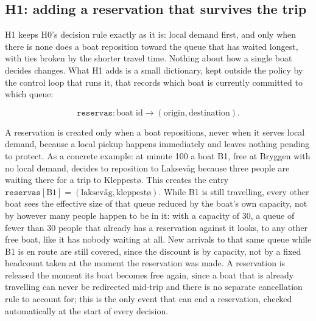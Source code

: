 \documentclass[11pt,a4paper]{article}
\begin{document}
\subsection{H1: adding a reservation that survives the trip}
\label{sec:h1}

H1 keeps H0's decision rule exactly as it is: local demand first, and only when there is none does a boat reposition toward the queue that has waited longest, with ties broken by the shorter travel time. Nothing about how a single boat decides changes. What H1 adds is a small dictionary, kept outside the policy by the control loop that runs it, that records which boat is currently committed to which queue:

\begin{equation}
\texttt{reservas}: \text{boat id} \rightarrow (\text{origin}, \text{destination}).
\end{equation}

A reservation is created only when a boat repositions, never when it serves local demand, because a local pickup happens immediately and leaves nothing pending to protect. As a concrete example: at minute 100 a boat B1, free at Bryggen with no local demand, decides to reposition to Laksevåg because three people are waiting there for a trip to Kleppestø. This creates the entry $\texttt{reservas}[\text{B1}] = (\text{laksevåg}, \text{kleppestø})$. While B1 is still travelling, every other boat sees the effective size of that queue reduced by the boat's own capacity, not by however many people happen to be in it: with a capacity of 30, a queue of fewer than 30 people that already has a reservation against it looks, to any other free boat, like it has nobody waiting at all. New arrivals to that same queue while B1 is en route are still covered, since the discount is by capacity, not by a fixed headcount taken at the moment the reservation was made. A reservation is released the moment its boat becomes free again, since a boat that is already travelling can never be redirected mid-trip and there is no separate cancellation rule to account for; this is the only event that can end a reservation, checked automatically at the start of every decision.
\end{document}
